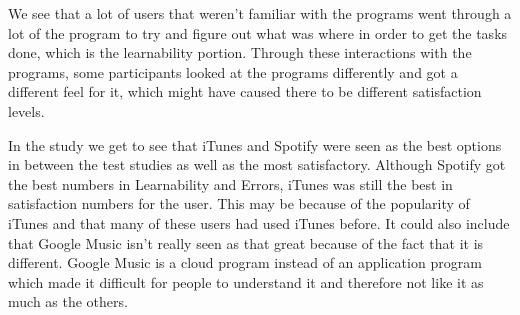 \documentclass{article}
\begin{document}
We see that a lot of users that weren’t familiar with the programs went through a lot of the program to try and figure out what was where in order to get the tasks done, which is the learnability portion.  Through these interactions with the programs, some participants looked at the programs differently and got a different feel for it, which might have caused there to be different satisfaction levels.

In the study we get to see that iTunes and Spotify were seen as the best options in between the test studies as well as the most satisfactory. Although Spotify got the best numbers in Learnability and Errors, iTunes was still the best in satisfaction numbers for the user. This may be because of the popularity of iTunes and that many of these users had used iTunes before. It could also include that Google Music isn’t really seen as that great because of the fact that it is different. Google Music is a cloud program instead of an application program which made it difficult for people to understand it and therefore not like it as much as the others.
\end{document}
